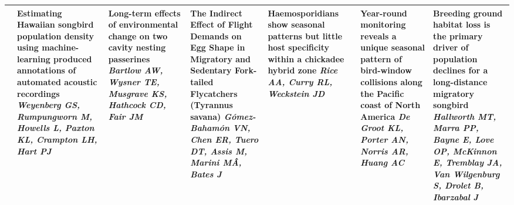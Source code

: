 \begin{tabular}{|x{0.75cm}|x{2.25cm}|a{2.25cm}|x{2.25cm}|x{2.25cm}|x{2.25cm}|x{2.25cm}|}
\hline
{}&Estimating Hawaiian songbird population density using machine-learning produced annotations of automated acoustic recordings \newline \newline \textit{Weyenberg GS, Rumpungworn M, Howells L, Paxton KL, Crampton LH, Hart PJ} & Long-term effects of environmental change on two cavity nesting passerines \newline \newline \textit{Bartlow AW, Wysner TE, Musgrave KS, Hathcock CD, Fair JM} & The Indirect Effect of Flight Demands on Egg Shape in Migratory and Sedentary Fork- tailed Flycatchers (Tyrannus savana) \newline \newline \textit{G\'{o}mez-Baham\'{o}n VN, Chen ER, Tuero DT, Assis M, Marini MÂ, Bates J} & Haemosporidians show seasonal patterns but little host specificity within a chickadee hybrid zone \newline \newline \textit{Rice AA, Curry RL, Weckstein JD} & Year-round monitoring reveals a unique seasonal pattern of bird-window collisions along the Pacific coast of North America \newline \newline \textit{De Groot KL, Porter AN, Norris AR, Huang AC} & Breeding ground habitat loss is the primary driver of population declines for a long-distance migratory songbird \newline \newline \textit{Hallworth MT, Marra PP, Bayne E, Love OP, McKinnon E, Tremblay JA, Van Wilgenburg S, Drolet B, Ibarzabal J}\\
\hline

\end{tabular}
